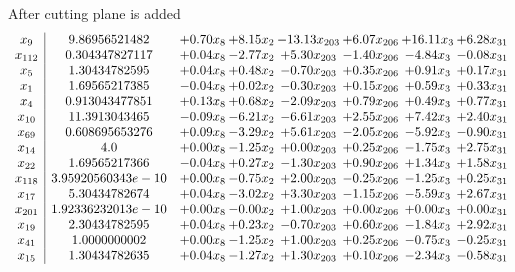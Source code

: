 \documentclass[8pt]{article}
\begin{document}
 After cutting plane is added 
\[\begin{array}{c| c c@{\hskip 2pt} c@{\hskip 2pt} c@{\hskip 2pt} c@{\hskip 2pt} c@{\hskip 2pt} c@{\hskip 2pt} }
 x_{9}   &  9.86956521482 & +  0.70 x_{8} & +  8.15 x_{2} & -13.13 x_{203} & +  6.07 x_{206} & + 16.11 x_{3} & +  6.28 x_{31}\\
 x_{112}   &  0.304347827117 & +  0.04 x_{8} & -2.77 x_{2} & +  5.30 x_{203} & -1.40 x_{206} & -4.84 x_{3} & -0.08 x_{31}\\
 x_{5}   &  1.30434782595 & +  0.04 x_{8} & +  0.48 x_{2} & -0.70 x_{203} & +  0.35 x_{206} & +  0.91 x_{3} & +  0.17 x_{31}\\
 x_{1}   &  1.69565217385 & -0.04 x_{8} & +  0.02 x_{2} & -0.30 x_{203} & +  0.15 x_{206} & +  0.59 x_{3} & +  0.33 x_{31}\\
 x_{4}   &  0.913043477851 & +  0.13 x_{8} & +  0.68 x_{2} & -2.09 x_{203} & +  0.79 x_{206} & +  0.49 x_{3} & +  0.77 x_{31}\\
 x_{10}   &  11.3913043465 & -0.09 x_{8} & -6.21 x_{2} & -6.61 x_{203} & +  2.55 x_{206} & +  7.42 x_{3} & +  2.40 x_{31}\\
 x_{69}   &  0.608695653276 & +  0.09 x_{8} & -3.29 x_{2} & +  5.61 x_{203} & -2.05 x_{206} & -5.92 x_{3} & -0.90 x_{31}\\
 x_{14}   &  4.0 & +  0.00 x_{8} & -1.25 x_{2} & +  0.00 x_{203} & +  0.25 x_{206} & -1.75 x_{3} & +  2.75 x_{31}\\
 x_{22}   &  1.69565217366 & -0.04 x_{8} & +  0.27 x_{2} & -1.30 x_{203} & +  0.90 x_{206} & +  1.34 x_{3} & +  1.58 x_{31}\\
 x_{118}   &  3.95920560343e-10 & +  0.00 x_{8} & -0.75 x_{2} & +  2.00 x_{203} & -0.25 x_{206} & -1.25 x_{3} & +  0.25 x_{31}\\
 x_{17}   &  5.30434782674 & +  0.04 x_{8} & -3.02 x_{2} & +  3.30 x_{203} & -1.15 x_{206} & -5.59 x_{3} & +  2.67 x_{31}\\
 x_{201}   &  1.92336232013e-10 & +  0.00 x_{8} & -0.00 x_{2} & +  1.00 x_{203} & +  0.00 x_{206} & +  0.00 x_{3} & +  0.00 x_{31}\\
 x_{19}   &  2.30434782595 & +  0.04 x_{8} & +  0.23 x_{2} & -0.70 x_{203} & +  0.60 x_{206} & -1.84 x_{3} & +  2.92 x_{31}\\
 x_{41}   &  1.0000000002 & +  0.00 x_{8} & -1.25 x_{2} & +  1.00 x_{203} & +  0.25 x_{206} & -0.75 x_{3} & -0.25 x_{31}\\
 x_{15}   &  1.30434782635 & +  0.04 x_{8} & -1.27 x_{2} & +  1.30 x_{203} & +  0.10 x_{206} & -2.34 x_{3} & -0.58 x_{31}\\

\end{array}\]
\end{document}
